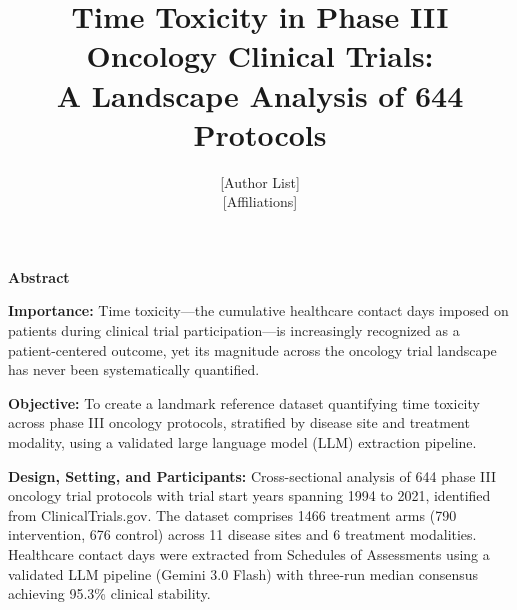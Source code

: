 \documentclass[12pt]{article}
\title{\textbf{Time Toxicity in Phase III Oncology Clinical Trials:\\A Landscape Analysis of 644 Protocols}}
\author{
[Author List]\\
\small [Affiliations]
}
\date{}
\begin{document}
\maketitle

\noindent{}

\vspace{12pt}

\noindent\textbf{Abstract}

\noindent\textbf{Importance:}
Time toxicity---the cumulative healthcare contact days imposed on patients during clinical trial participation---is increasingly recognized as a patient-centered outcome, yet its magnitude across the oncology trial landscape has never been systematically quantified.

\noindent\textbf{Objective:}
To create a landmark reference dataset quantifying time toxicity across phase III oncology protocols, stratified by disease site and treatment modality, using a validated large language model (LLM) extraction pipeline.

\noindent\textbf{Design, Setting, and Participants:}
Cross-sectional analysis of 644 phase III oncology trial protocols with trial start years spanning 1994 to 2021, identified from ClinicalTrials.gov. The dataset comprises 1466 treatment arms (790 intervention, 676 control) across 11 disease sites and 6 treatment modalities. Healthcare contact days were extracted from Schedules of Assessments using a validated LLM pipeline (Gemini 3.0 Flash) with three-run median consensus achieving 95.3\% clinical stability.
\end{document}

